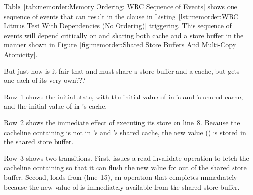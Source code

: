 Table~\ref{tab:memorder:Memory Ordering: WRC Sequence of Events}
shows one sequence of events that can result in the  clause in
Listing~\ref{lst:memorder:WRC Litmus Test With Dependencies (No Ordering)}
triggering.
This sequence of events will depend critically on  and
 sharing both cache and a store buffer in the manner shown in
Figure~\ref{fig:memorder:Shared Store Buffers And Multi-Copy Atomicity}.

\QuickQuiz{}
	But just how is it fair that  and  must share a store
	buffer and a cache, but  gets one each of its very own???
 \QuickQuizEnd

Row~1 shows the initial state, with the initial value of  in
's and 's shared cache, and the initial value of  in
's cache.

Row~2 shows the immediate effect of  executing its store on line~8.
Because the cacheline containing  is not in 's and 's
shared cache, the new value () is stored in the shared store buffer.

Row~3 shows two transitions.
First,  issues a read-invalidate operation to fetch the cacheline
containing  so that it can flush the new value for  out of
the shared store buffer.
Second,  loads from  (line~15), an operation that completes
immediately because the new value of  is immediately available
from the shared store buffer.

